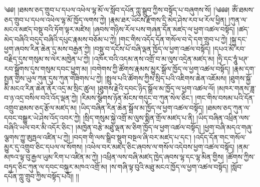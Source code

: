 \setcounter{footnote}{0} 
༄༅། །ཐམས་ཅད་གྲུབ་པ་དཔལ་འཕེལ་ལྷ་མོ་ལ་སློབ་དཔོན་ཀླུ་སྒྲུབ་ཀྱིས་བསྟོད་པ་བཞུགས་སོ། །༄༅༅། ཨོཾ་ཐམས་ཅད་གྲུབ་པ་དཔལ་འཕེལ་ལྷ་མོ་ཁྱོད་ལགས་ཀྱེ། །རྣམ་ཐར་ཡོངས་རྫོགས་དྲི་མེད་ཤེས་རབ་ཕ་རོལ་ཕྱིན། །ཀུན་ལ་མངའ་མཛད་བསྡུ་བའི་ཏོག་ལྟར་མཛེས། །ཞབས་གཉིས་རོལ་པས་གཞན་དོན་མཛད་ལ་ཕྱག་འཚལ་བསྟོད། །ཚད་མེད་བཞིའི་བདུད་བཞིའི་དཔུང་རྣམས་བཅོམ་པ་ཀྱེ། །གང་གིས་འདོད་དོན་གསོལ་བ་དེ་དག་གྲུབ་པ་ཀྱེ། །སྐུ་དང་ཕྱག་ཞབས་རིན་ཆེན་དུ་མས་བརྒྱན་ཀྱེ། །བསྡུ་བ་དངོས་པོ་བཞི་ལྡན་ཁྱོད་ལ་ཕྱག་འཚལ་བསྟོད། །དཔའ་མོ་རབ་བརྗིད་དུས་གསུམ་ས་ལེར་མཁྱེན་པ་ཀྱེ། །འཁོར་བའི་འདམ་ནས་འགྲོ་བ་མ་ལུས་འདྲེན་མཛད་མ། །ཧྲི་དང་ཧཱུཾ་ཕཊ་རབ་སྒྲོགས་དུས་གསུམ་དབང་ཕྱུག་མ། །བགེགས་ཀྱི་ཚོགས་རྣམས་མྱུར་སྒྲོལ་ཁྱོད་ལ་ཕྱག་འཚལ་བསྟོད། །རྣམ་དག་སྤྱན་གྱིས་ཡུལ་ཀུན་དུས་ཀུན་གཟིགས་པ་ཀྱེ། །སྤྲུལ་པའི་ཚོགས་ཀྱིས་སྲིད་པའི་འཇིགས་ཆེན་འཇོམས། །ཐུགས་སྐྱོ་མི་མངའ་རིན་ཆེན་ནོར་འདྲ་མ་སྲིང་ཚུལ། །ཐུགས་རྗེའི་དབང་ཉིད་སྒྲོལ་མ་ཁྱོད་ལ་ཕྱག་འཚལ་ལོ། །མཁར་གནས་ཟླ་བ་ཉ་འདྲ་བསིལ་བའི་འོད་ལྡན་ཀྱེ། །རིམས་སྩོགས་ཉོན་མོངས་གདུང་བ་ཀུན་སེལ་ཅིང་། །གང་གིས་བསམ་པའི་དོན་འགྲུབ་ཐམས་ཅད་རྩོལ་མཛད་མ། །ཡིད་བཞིན་རིན་ཆེན་སྒྲོལ་མ་ཁྱོད་ལ་ཕྱག་འཚལ་བསྟོད། །ཐམས་ཅད་ཀུན་ལ་དབང་བསྒྱུར་ཡེ་ཤེས་འོད་འབར་ཀྱེ། །སྲིད་གསུམ་སྐྱེ་འགྲོ་མ་ལུས་སྨིན་གྲོལ་མཛད་པ་ནི། །ཡིད་བཞིན་འཕྲིན་ལས་བཞིའི་ཡལ་བར་མི་འདོར་ཅིང་། །མཁྱེན་བརྩེ་མཐུ་ལྡན་མ་ཅིག་ཁྱོད་ལ་ཕྱག་འཚལ་བསྟོད། །ཕྱག་བཞི་མདའ་གཞུ་ལྕགས་ཀྱུ་ཨུཏྤལ་འཛིན་པ་ཀྱེ། །བདག་གི་ལས་སྒྲིབ་སྡུག་བསྔལ་ཞི་བར་མཛད་པ་དང་། །འདོད་དོན་གང་གསོལ་མྱུར་དུ་འགྲུབ་ཅིང་དཔལ་ལ་སོགས། །འཕེལ་བར་མཛད་ཅིང་ཞབས་ལ་གསོལ་འདེབས་ཕྱག་འཚལ་བསྟོད། །ནམ་མཁའ་ལྟ་བུ་རྒྱལ་ཡུམ་རིག་པ་འཛིན་མ་ཀྱེ། །འཕྲིན་ལས་བཞི་མཛད་ཁྱེད་ཞབས་ལྷ་དང་ལྷ་མིན་གྱིས། །ཚོགས་ཀྱིས་བཏུད་ཅིང་ཀུན་ལ་དབང་བསྐུར་མཁའ་འགྲོ་མ། །ས་གཞི་ལྟ་བུའི་མཐུ་མངའ་ཁྱོད་ལ་ཕྱག་འཚལ་བསྟོད། །སློབ་དཔོན་ཀླུ་གྲུབ་ཀྱིས་བསྟོད་པའོ།། །།